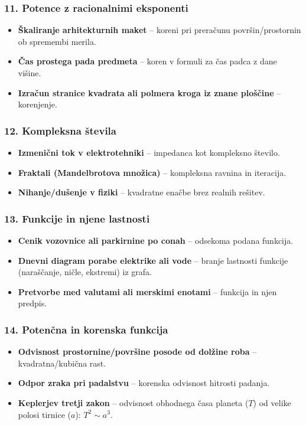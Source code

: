 \documentclass[11pt,a4paper]{article}
\begin{document}
\subsubsection*{11. Potence z racionalnimi eksponenti}
\begin{itemize}
  \item \textbf{Škaliranje arhitekturnih maket} -- koreni pri preračunu površin/prostornin ob spremembi merila.
  \item \textbf{Čas prostega pada predmeta} -- koren v formuli za čas padca z dane višine.
  \item \textbf{Izračun stranice kvadrata ali polmera kroga iz znane ploščine} -- korenjenje.
\end{itemize}

\subsubsection*{12. Kompleksna števila}
\begin{itemize}
  \item \textbf{Izmenični tok v elektrotehniki} -- impedanca kot kompleksno število.
  \item \textbf{Fraktali (Mandelbrotova množica)} -- kompleksna ravnina in iteracija.
  \item \textbf{Nihanje/dušenje v fiziki} -- kvadratne enačbe brez realnih rešitev.
\end{itemize}

\subsubsection*{13. Funkcije in njene lastnosti}
\begin{itemize}
  \item \textbf{Cenik vozovnice ali parkirnine po conah} -- odsekoma podana funkcija.
  \item \textbf{Dnevni diagram porabe elektrike ali vode} -- branje lastnosti funkcije (naraščanje, ničle, ekstremi) iz grafa.
  \item \textbf{Pretvorbe med valutami ali merskimi enotami} -- funkcija in njen predpis.
\end{itemize}

\subsubsection*{14. Potenčna in korenska funkcija}
\begin{itemize}
  \item \textbf{Odvisnost prostornine/površine posode od dolžine roba} -- kvadratna/kubična rast.
  \item \textbf{Odpor zraka pri padalstvu} -- korenska odvisnost hitrosti padanja.
  \item \textbf{Keplerjev tretji zakon} -- odvisnost obhodnega časa planeta ($T$) od velike polosi tirnice ($a$): $T^2 \sim a^3$.
\end{itemize}
\end{document}
